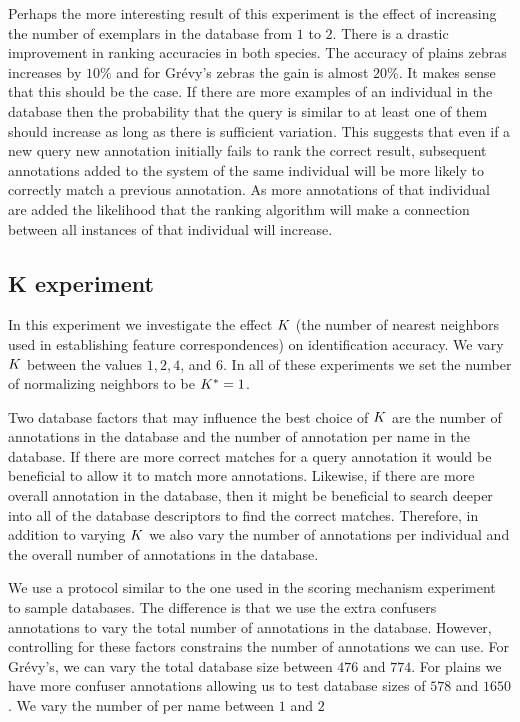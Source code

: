         Perhaps the more interesting result of this experiment is the effect of increasing the number of
          exemplars in the database from $1$ to $2$.
        There is a drastic improvement in ranking accuracies in both species.
        The accuracy of plains zebras increases by $10\percent$ and for Grévy's zebras the gain is almost
          $20\percent$.
        It makes sense that this should be the case.
        If there are more examples of an individual in the database then the probability that the query is
          similar to at least one of them should increase as long as there is sufficient variation.
        This suggests that even if a new query new annotation initially fails to rank the correct result,
          subsequent annotations added to the system of the same individual will be more likely to correctly match
          a previous annotation.
        As more annotations of that individual are added the likelihood that the ranking algorithm will make a
          connection between all instances of that individual will increase.


    \subsection{K experiment}\label{sub:exptk}  

        In this experiment we investigate the effect $K$ (the number of nearest neighbors used in establishing
          feature correspondences) on identification accuracy.
        We vary $K$ between the values $1, 2, 4$, and $6$.
        In all of these experiments we set the number of normalizing neighbors to be $K^{*}=1$.

        \KExpt{}

        Two database factors that may influence the best choice of $K$ are the number of annotations in the
          database and the number of annotation per name in the database.
        If there are more correct matches for a query annotation it would be beneficial to allow it to match more
          annotations.
        Likewise, if there are more overall annotation in the database, then it might be beneficial to search
          deeper into all of the database descriptors to find the correct matches.
        Therefore, in addition to varying $K$ we also vary the number of annotations per individual and the
          overall number of annotations in the database.

        We use a protocol similar to the one used in the scoring mechanism experiment to sample databases.
        The difference is that we use the extra confusers annotations to vary the total number of annotations in
          the database.
        However, controlling for these factors constrains the number of annotations we can use.
        For Grévy's, we can vary the total database size between $476$ and $774$.
        For plains we have more confuser annotations allowing us to test database sizes of $578$ and $1650$.
        We vary the number of \exemplars{} per name between $1$ and $2$

